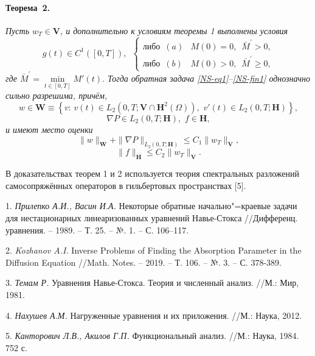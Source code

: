 \paragraph{Теорема~2.} {\it
Пусть $w_T\in\mathbf{V}$, и дополнительно к условиям теоремы 1 выполнены условия
\begin{equation}\label{NS-cond1}
g(t)\in C^1([0,T]),\,\,\,\left\{\begin{array}{ll}
                         \textrm{либо}\,\,\, (a)&M(0)=0,\,\,\, \bar{M}^{\prime}>0,\\
                         \textrm{либо}\,\,\, (b)&M(0)>0,\,\,\, \bar{M}^{\prime}\geq0,
                         \end{array}\right.
\end{equation}
где $\bar{M}^{\prime}=\min\limits_{t\in[0,T]}M'(t).$
Тогда обратная задача \eqref{NS-eq1}--\eqref{NS-fin1} однозначно сильно разрешима, причём,
$$
w\in \mathbf{W}\equiv \left\{v:\, v(t)\in L_2(0,T;\mathbf{V}\cap\mathbf{H}^2(\Omega)),\,\, v'(t)\in L_2(0,T;\mathbf{H})\right\},
$$
$$
\nabla P\in L_2(0,T; \mathbf{H}),\,\, f\in \mathbf{H},
$$
и имеют место оценки
\begin{equation} \label{NS-est3}
\|w\|_{\mathbf{W}}+\|\nabla P\|_{L_2(0,T; \mathbf{H})}\leq C_1\|w_T\|_{\mathbf{V}},
\end{equation}
\begin{equation} \label{NS-est4}
\|f\|_{\mathbf{H}}\leq C_2\|w_T\|_{\mathbf{V}}.
\end{equation}
}

В доказательствах теорем 1 и 2 используется теория спектральных разложений самосопряжённых операторов в гильбертовых пространствах [5].

\litlist



1. {\it Прилепко А.И., Васин И.А.} Некоторые обратные начально"=краевые задачи для нестационарных линеаризованных уравнений Навье-Стокса //Дифференц. уравнения. – 1989. – Т. 25. – №. 1. – С. 106–117.

2. {\it Kozhanov A.I.} Inverse Problems of Finding the Absorption Parameter in the Diffusion Equation //Math. Notes. – 2019. – Т. 106. – №. 3. – С. 378-389.

3. {\it Темам Р.} Уравнения Навье-Стокса. Теория и численный анализ. //М.: Мир, 1981.

4. {\it Нахушев А.М.}  Нагруженные уравнения и их приложения. //М.: Наука, 2012.

5. {\it Канторович Л.В., Акилов Г.П.} Функциональный анализ. //М.: Наука, 1984. 752 с.

